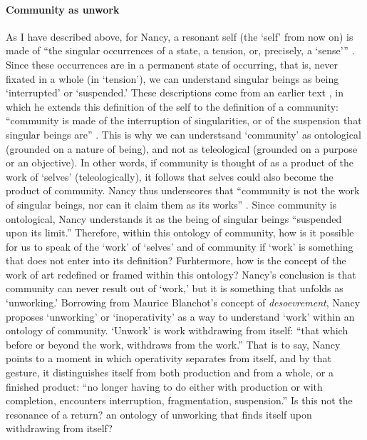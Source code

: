 

\paragraph{Community as unwork}
As I have described above, for Nancy, a resonant self (the `self' from now on) is made of ``the singular occurrences of a state, a tension, or, precisely, a `sense''' \parencite[8]{Nan07:Lis}. Since these occurrences are in a permanent state of occurring, that is, never fixated in a whole (in `tension'), we can understand singular beings as being `interrupted' or `suspended.' These descriptions come from an earlier text \textcite{Nan91:The}, in which he extends this definition of the self to the definition of a community: ``community is made of the interruption of singularities, or of the suspension that singular beings are'' \parencite[31][All subsequent quotes from this passage.]{Nan91:The}. This is why we can understsand `community' as ontological (grounded on a nature of being), and not as teleological (grounded on a purpose or an objective). In other words, if community is thought of as a product of the work of `selves' (teleologically), it follows that selves could also become the product of community. Nancy thus underscores that ``community is not the work of singular beings, nor can it claim them as its works'' . Since community is ontological, Nancy understands it as the being of singular beings ``suspended upon its limit.'' Therefore, within this ontology of community, how is it possible for us to speak of the `work' of `selves' and of community if `work' is something that does not enter into its definition? Furhtermore, how is the concept of the work of art redefined or framed within this ontology? Nancy's conclusion is that community can never result out of `work,' but it is something that unfolds as `unworking.' Borrowing from Maurice Blanchot's concept of \textit{desoevrement}, Nancy proposes `unworking' or `inoperativity' as a way to understand `work' within an ontology of community. `Unwork' is work withdrawing from itself: ``that which before or beyond the work, withdraws from the work.'' That is to say, Nancy points to a moment in which operativity separates from itself, and by that gesture, it distinguishes itself from both production and from a whole, or a finished product: ``no longer having to do either with production or with completion, encounters interruption, fragmentation, suspension.'' Is this not the resonance of a return? an ontology of unworking that finds itself upon withdrawing from itself?

